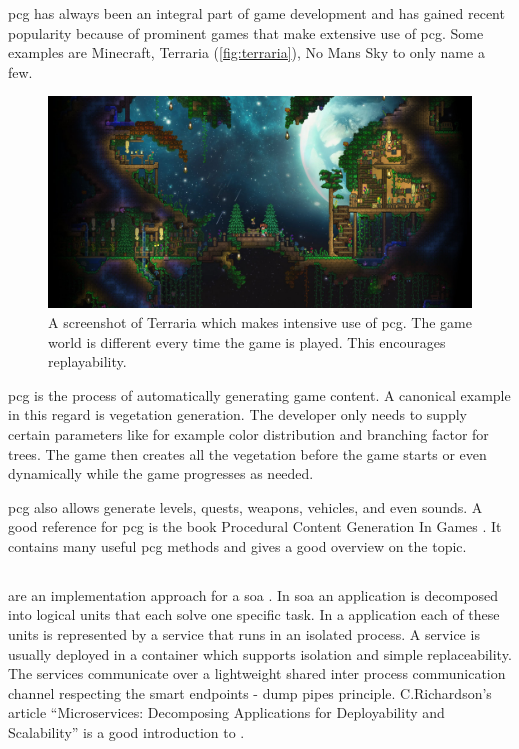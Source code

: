 \gls{pcg} has always been an integral part of game
development and has gained recent popularity because of prominent games that
make extensive use of \gls{pcg}. Some examples are Minecraft, Terraria
(\autoref{fig:terraria}), No Mans Sky to only name a few.

\begin{figure}
	\centering
	\includegraphics[width=\textwidth]{images/terraria}
	\caption{A screenshot of Terraria which makes intensive use of \gls{pcg}. The game
	world is different every time the game is played. This encourages
	replayability.}
	\label{fig:terraria}
\end{figure}

\gls{pcg} is the process of automatically generating game content. A canonical
example in this regard is vegetation generation. The developer only needs to
supply certain parameters like for example color distribution and branching
factor for trees. The game then creates all the vegetation before the game
starts or even dynamically while the game progresses as needed.

\gls{pcg} also allows generate levels, quests, weapons, vehicles, and even
sounds. A good reference for \gls{pcg} is the book Procedural Content Generation In
Games \cite{shaker2014procedural}. It contains many useful \gls{pcg} methods and
gives a good overview on the topic.

\subsection{\mss{}}

\mss{} are an implementation approach for a \gls{soa}
\cite{zimmermann2016microservices}. In \gls{soa} an application is decomposed
into logical units that each solve one specific task. In a \ms{} application
each of these units is represented by a service that runs in an isolated
process. A service is usually deployed in a container which supports isolation
and simple replaceability. The services communicate over a lightweight shared
inter process communication channel respecting the smart endpoints - dump pipes
principle. C.Richardson's article ``Microservices: Decomposing Applications for
Deployability and Scalability'' \cite{richardson2014mss} is a good introduction to
\mss{}.

